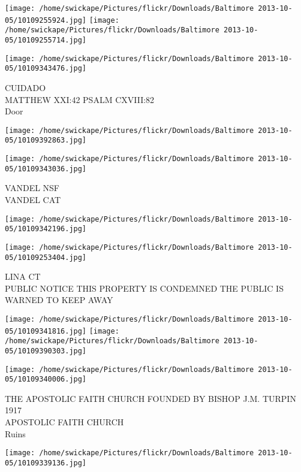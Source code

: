 \documentclass[10pt,letterpaper]{article}
\begin{document}
\texttt{[image: /home/swickape/Pictures/flickr/Downloads/Baltimore 2013-10-05/10109255924.jpg]}
\texttt{[image: /home/swickape/Pictures/flickr/Downloads/Baltimore 2013-10-05/10109255714.jpg]}

\texttt{[image: /home/swickape/Pictures/flickr/Downloads/Baltimore 2013-10-05/10109343476.jpg]}

CUIDADO\\
MATTHEW XXI:42 PSALM CXVIII:82\\
Door\\
\pagebreak

\texttt{[image: /home/swickape/Pictures/flickr/Downloads/Baltimore 2013-10-05/10109392863.jpg]}

\vspace{0.25in}
\texttt{[image: /home/swickape/Pictures/flickr/Downloads/Baltimore 2013-10-05/10109343036.jpg]}

VANDEL NSF\\
VANDEL CAT\\
\pagebreak

\texttt{[image: /home/swickape/Pictures/flickr/Downloads/Baltimore 2013-10-05/10109342196.jpg]}

\vspace{0.25in}
\texttt{[image: /home/swickape/Pictures/flickr/Downloads/Baltimore 2013-10-05/10109253404.jpg]}

LINA CT\\
PUBLIC NOTICE THIS PROPERTY IS CONDEMNED THE PUBLIC IS WARNED TO KEEP AWAY\\
\pagebreak

\texttt{[image: /home/swickape/Pictures/flickr/Downloads/Baltimore 2013-10-05/10109341816.jpg]}
\texttt{[image: /home/swickape/Pictures/flickr/Downloads/Baltimore 2013-10-05/10109390303.jpg]}

\vspace{0.25in}
\texttt{[image: /home/swickape/Pictures/flickr/Downloads/Baltimore 2013-10-05/10109340006.jpg]}

THE APOSTOLIC FAITH CHURCH FOUNDED BY BISHOP J.M. TURPIN 1917\\
APOSTOLIC FAITH CHURCH\\
Ruins\\
\pagebreak

\texttt{[image: /home/swickape/Pictures/flickr/Downloads/Baltimore 2013-10-05/10109339136.jpg]}
\end{document}

